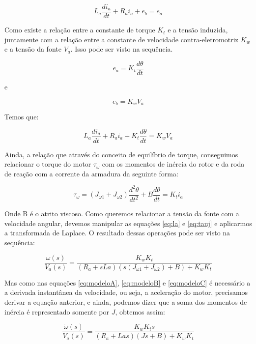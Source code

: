 \begin{equation}
L_a \frac{di_a}{dt}+R_a i_a + e_b = e_a
\end{equation}

Como existe a relação entre a constante de torque $K_t$ e a tensão induzida, juntamente com a relação entre a constante de velocidade contra-eletromotriz $K_w$ e a tensão da fonte $V_a$. Isso pode ser visto na sequência.

\begin{equation}
  e_a = K_t\frac{d\theta}{dt}
\end{equation}

e

\begin{equation}
  e_b = K_wV_a
\end{equation}

Temos que:

\begin{equation}\label{eq:la}
L_a \frac{di_a}{dt}+R_a i_a + K_t\frac{d\theta}{dt} = K_wV_a
\end{equation}

Ainda, a relação que através do conceito de equilíbrio de torque, conseguimos relacionar o torque do motor $\tau_{\omega}$ com os momentos de inércia do rotor e da roda de reação com a corrente da armadura da seguinte forma:

\begin{equation}\label{eq:tauj}
\tau_{\omega} = (J_{\omega 1} + J_{\omega 2})\frac{d^{2}\theta}{dt^{2}}+B\frac{d\theta}{dt} = K_t i_a
\end{equation}

Onde B é o atrito viscoso. Como queremos relacionar a tensão da fonte com a velocidade angular, devemos manipular as equações \ref{eq:la} e \ref{eq:tauj} e aplicarmos a transformada de Laplace. O resultado dessas operações pode ser visto na sequência: 

\begin{equation}
  \frac{\omega(s)}{V_a(s)} = \frac{K_wK_t}{(R_a+ sLa)(s(J_{\omega 1} + J_{\omega 2})+B)+K_wK_t}  
\end{equation}

Mas como nas equações \ref{eq:modeloA}, \ref{eq:modeloB} e \ref{eq:modeloC} é necessário a a derivada instantânea da velocidade, ou seja, a aceleração do motor, precisamos derivar a equação anterior, e ainda, podemos dizer que a soma dos momentos de inércia é representado somente por $J$, obtemos assim:

\begin{equation}\label{eq:motor_accel}
  \frac{\dot{\omega}(s)}{V_a(s)} = \frac{K_wK_t s}{(R_a+ Las)(Js+B)+K_wK_t}  
\end{equation}

